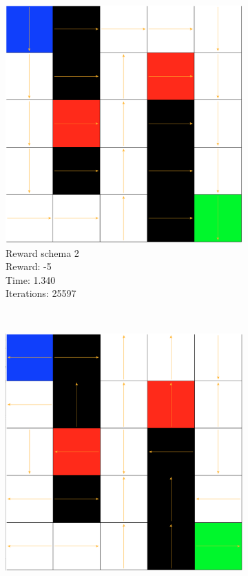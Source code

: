 \documentclass[a4paper,10pt]{article}
\begin{document}
\begin{figure}[h!]
        \begin{subfigure}[b]{0.3\textwidth}
                \includegraphics[width=\textwidth]{figures/5x5_qlearn_r2.png}
                \caption{Reward schema 2\\
                Reward: -5\\
                Time:  1.340\\
                Iterations: 25597 }
                \label{fig:tiger}
        \end{subfigure}
        ~ %
        \begin{subfigure}[b]{0.3\textwidth}
                \includegraphics[width=\textwidth]{figures/5x5_qlearn_r3.png}

\end{subfigure}
\end{figure}
\end{document}
